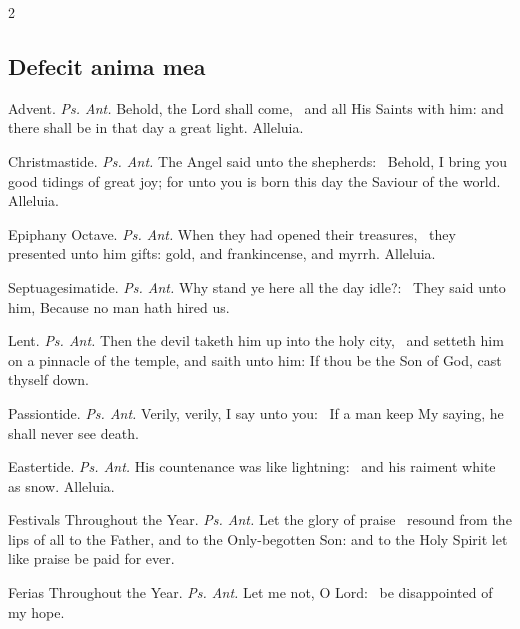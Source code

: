 \begin{multicols}{2}
\subsection{Defecit anima mea}
\par\noindent
{\color{RubricRed}Advent.} \textit{Ps. Ant.} Behold, the Lord shall come,~{\dag} and all His Saints with him: and there shall be in that day a great light. Alleluia.
\par\noindent
{\color{RubricRed}Christmastide.} \textit{Ps. Ant.} The Angel said unto the shepherds:~{\dag} Behold, I bring you good tidings of great joy; for unto you is born this day the Saviour of the world. Alleluia.
\par\noindent
{\color{RubricRed}Epiphany Octave.} \textit{Ps. Ant.} When they had opened their treasures,~{\dag} they presented unto him gifts: gold, and frankincense, and myrrh. Alleluia.
\par\noindent
{\color{RubricRed}Septuagesimatide.} \textit{Ps. Ant.} Why stand ye here all the day idle?:~{\dag} They said unto him, Because no man hath hired us.
\par\noindent
{\color{RubricRed}Lent.} \textit{Ps. Ant.}  Then the devil taketh him up into the holy city,~{\dag} and setteth him on a pinnacle of the temple, and saith unto him: If thou be the Son of God, cast thyself down.
\par\noindent
{\color{RubricRed}Passiontide.} \textit{Ps. Ant.} Verily, verily, I say unto you:~{\dag} If a man keep My saying, he shall never see death.
\par\noindent
{\color{RubricRed}Eastertide.} \textit{Ps. Ant.} His countenance was like lightning:~{\dag} and his raiment white as snow. Alleluia.
\par\noindent
{\color{RubricRed}Festivals Throughout the Year.} \textit{Ps. Ant.} Let the glory of praise~{\dag} resound from the lips of all to the Father, and to the Only-begotten Son: and to the Holy Spirit let like praise be paid for ever.
\par\noindent
{\color{RubricRed}Ferias Throughout the Year.} \textit{Ps. Ant.} Let me not, O Lord:~{\dag} be disappointed of my hope.\\


\end{multicols}
